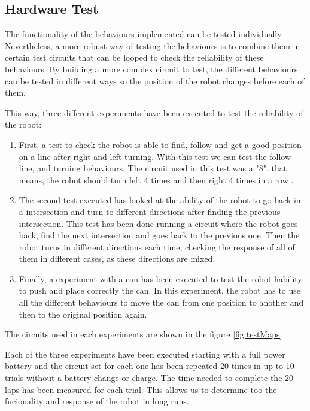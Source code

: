 
\subsection{Hardware Test}

The functionality of the behaviours implemented can be tested individually.
Nevertheless, a more robust way of testing the behaviours is to combine them in certain test circuits that can be looped to check the reliability of these behaviours.
By building a more complex circuit to test, the different behaviours can be tested in different ways so the position of the robot changes before each of them.

This way, three different experiments have been executed to test the reliability of the robot:

\begin{enumerate}
	\item First, a test to check the robot is able to find, follow and get a good position on a line after right and left turning. 
With this test we can test the follow line, and turning behaviours.
The circuit used in this test was a "8", that means, the robot should turn left 4 times and then right 4 times in a row
.

	\item The second test executed has looked at the ability of the robot to go back in a intersection and turn to different directions after finding the previous intersection.
This test has been done running a circuit where the robot goes back, find the next intersection and goes back to the previous one. 
Then the robot turns in different directions each time, checking the response of all of them in different cases, as these directions are mixed.

	\item Finally, a experiment with a can has been executed to test the robot hability to push and place correctly the can.
In this experiment, the robot has to use all the different behaviours to move the can from one position to another and then to the original position again.

\end{enumerate}

The circuits used in each experiments are shown in the figure \ref{fig:testMaps}

Each of the three experiments have been executed starting with a full power battery and the circuit set for each one has been repeated 20 times in up to 10 trials without a battery change or charge.
The time needed to complete the 20 laps has been measured for each trial.
This allows us to determine too the fucionality and response of the robot in long runs.

